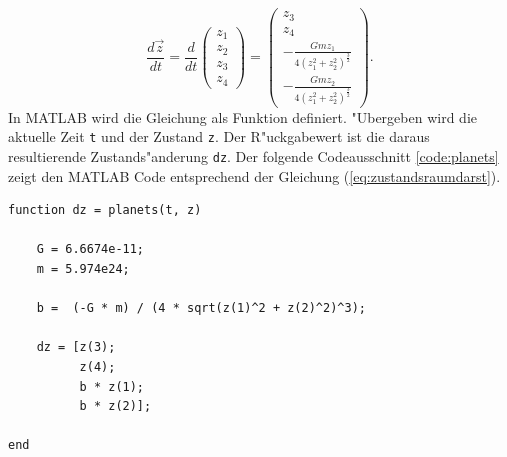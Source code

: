 \begin{refsection}
\begin{equation}\label{eq:zustandsraumdarst}
\frac{d \vec{z}}{dt}=\frac{d}{dt} \begin{pmatrix}
z_1 \\ 
z_2 \\
z_3 \\
z_4
\end{pmatrix} = \begin{pmatrix}
z_3 \\ 
z_4 \\[1mm]
\displaystyle-\frac{G m z_1}{4(z_1^2 + z_2^2)^\frac32} \\[4mm]
\displaystyle-\frac{G m z_2}{4(z_1^2 + z_2^2)^\frac32}
\end{pmatrix}.
\end{equation}
In MATLAB wird die Gleichung als Funktion definiert.
"Ubergeben wird die aktuelle Zeit \texttt{t} und der Zustand \texttt{z}.
Der R"uckgabewert ist die daraus resultierende  Zustands"anderung \texttt{dz}.
Der folgende Codeausschnitt \ref{code:planets} zeigt den MATLAB Code entsprechend der Gleichung (\ref{eq:zustandsraumdarst}).
\begin{lstlisting}[style=MATLAB, caption={Problemfunktion}, captionpos=b, label={code:planets}]
function dz = planets(t, z)

    G = 6.6674e-11;
    m = 5.974e24;

    b =  (-G * m) / (4 * sqrt(z(1)^2 + z(2)^2)^3);
    
    dz = [z(3);
          z(4);
          b * z(1);
          b * z(2)];
      
end
\end{lstlisting}


\end{refsection}
